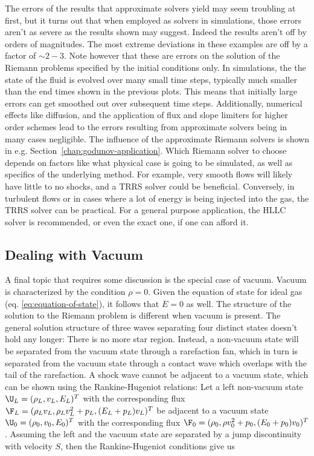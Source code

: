 The errors of the results that approximate solvers yield may seem troubling at first, but it turns
out that when employed as solvers in simulations, those errors aren't as severe as the results
shown may suggest. Indeed the results aren't off by orders of magnitudes. The most extreme
deviations in these examples are off by a factor of $\sim 2 - 3$. Note however that these are errors
on the solution of the Riemann problems specified by the initial conditions only. In simulations,
the the state of the fluid is evolved over  many small time steps, typically much smaller than the
end times shown in the previous plots. This means that initially large errors can get smoothed out
over subsequent time steps. Additionally, numerical effects like diffusion, and the application of
flux and slope limiters for higher order schemes lead to the errors resulting from approximate
solvers being in many cases negligible. The influence of the approximate Riemann solvers is shown
in e.g. Section~\ref{chap:godunov-application}. Which Riemann solver to choose depends on factors
like what physical case is going to be simulated, as well as specifics of the underlying method.
For example, very smooth flows will likely have little to no shocks, and a TRRS solver could be
beneficial. Conversely, in turbulent flows or in cases where a lot of energy is being injected into
the gas, the TRRS solver can be practical. For a general purpose application, the HLLC solver is
recommended, or even the exact one, if one can afford it.










\subsection{Dealing with Vacuum}\label{chap:vacuum}

A final topic that requires some discussion is the special case of vacuum. Vacuum is characterized
by the condition $\rho = 0$. Given the equation of state for ideal gas (eq.
\ref{eq:equation-of-state}), it follows that $E = 0$ as well.
The structure of the solution to the Riemann problem is different when vacuum is present. The
general solution structure of three waves separating four distinct states doesn't hold any longer:
There is no more star region. Instead, a non-vacuum state will be separated from the vacuum state
through a rarefaction fan, which in turn is separated from the vacuum state through a contact wave
which overlaps with the tail of the rarefaction. A shock wave cannot be adjacent to a vacuum state,
which can be shown using the Rankine-Hugeniot relations: Let a left non-vacuum state $\U_L =
(\rho_L, v_L, E_L)^T$ with the corresponding flux $\F_L = (\rho_L v_L, \rho_L v_L^2 + p_L, (E_L +
p_L) v_L)^T$ be adjacent to a vacuum state $\U_0 = (\rho_0, v_0, E_0)^T$ with the corresponding flux
$\F_0 = (\rho_0, \rho v_0^2 + p_0, (E_0 + p_0) v_0)^T$. Assuming the left and the vacuum state are
separated by a jump discontinuity with velocity $S$, then the Rankine-Hugeniot conditions give us

